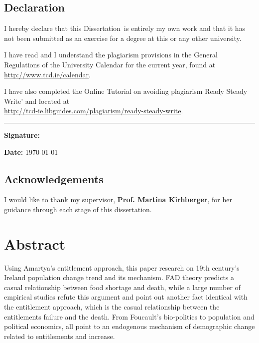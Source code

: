 \documentclass[a4paper,oneside,12pt]{book}
\title{\thesistitle}
\author{\authorname}
\newcommand{\typeofthesis}{Dissertation} %
\begin{document}

\doublespacing

\newpage

\section*{Declaration}
I hereby declare that this \typeofthesis\ is entirely my own work and that it has not been submitted as an exercise for a degree at this or any other university.

I have read and I understand the plagiarism provisions in the General Regulations of the University Calendar for the current year, found at\\
 \url{http://www.tcd.ie/calendar}.

I have also completed the Online Tutorial on avoiding plagiarism Ready Steady Write' and located at \\
 \url{http://tcd-ie.libguides.com/plagiarism/ready-steady-write}.

\vspace{.3cm}
\rule{10cm}{.3pt}

\begin{flushleft}
	\begin{minipage}{\linewidth}
		\textbf{Signature:} 
	\end{minipage}
\end{flushleft}
\textbf{Date: } \today
\vspace{.3cm}

\newpage

\section*{Acknowledgements}
I would like to thank my supervisor, \textbf{Prof. Martina Kirhberger}, for her guidance through each stage of this dissertation.

\chapter{Abstract}

Using Amartya's entitlement approach, this paper research on 19th century's Ireland population change trend and its mechanism. FAD theory predicts a casual relationship between food shortage and death, while a large number of empirical studies refute this argument and point out another fact identical with the entitlement approach, which is the casual relationship between the entitlements failure and the death. From Foucault's bio-politics to population and political economics, all point to an endogenous mechanism of demographic change related to entitlements and increase.
\end{document}
